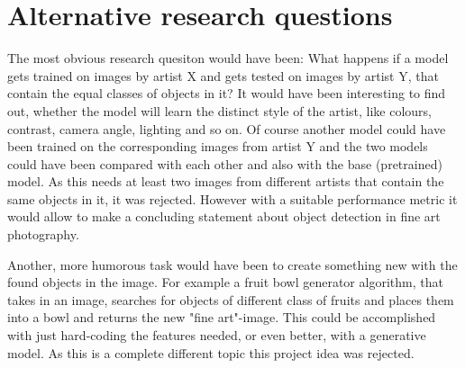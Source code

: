 \section{Alternative research questions}

The most obvious research quesiton would have been: What happens if a model gets trained on images by artist X and gets tested on images by artist Y, that contain the equal classes of objects in it? It would have been interesting to find out, whether the model will learn the distinct style of the artist, like colours, contrast, camera angle, lighting and so on. Of course another model could have been trained on the corresponding images from artist Y and the two models could have been compared with each other and also with the base (pretrained) model. As this needs at least two images from different artists that contain the same objects in it, it was rejected. However with a suitable performance metric it would allow to make a concluding statement about object detection in fine art photography.

Another, more humorous task would have been to create something new with the found objects in the image. For example a fruit bowl generator algorithm, that takes in an image, searches for objects of different class of fruits and places them into a bowl and returns the new "fine art"-image. This could be accomplished with just hard-coding the features needed, or even better, with a generative model. As this is a complete different topic this project idea was rejected.